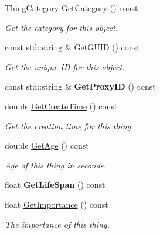\begin{DoxyCompactItemize}
\mbox{\label{class_i_thing_a8a52dd5d10428c02123a5728ad4778cb}} 
Thing\+Category \hyperlink{class_i_thing_a8a52dd5d10428c02123a5728ad4778cb}{Get\+Category} () const
\begin{DoxyCompactList}\small\item\em Get the category for this object. \end{DoxyCompactList}\item 
\mbox{\label{class_i_thing_a48a5ff5298034f14de4e8a87073f7a45}} 
const std\+::string \& \hyperlink{class_i_thing_a48a5ff5298034f14de4e8a87073f7a45}{Get\+G\+U\+ID} () const
\begin{DoxyCompactList}\small\item\em Get the unique ID for this object. \end{DoxyCompactList}\item 
\mbox{\label{class_i_thing_a3a0ba98bc1f6fd31344d860063ca7fea}} 
const std\+::string \& {\bfseries Get\+Proxy\+ID} () const
\item 
\mbox{\label{class_i_thing_ab664750ec76615c0191d99d050efebf9}} 
double \hyperlink{class_i_thing_ab664750ec76615c0191d99d050efebf9}{Get\+Create\+Time} () const
\begin{DoxyCompactList}\small\item\em Get the creation time for this thing. \end{DoxyCompactList}\item 
\mbox{\label{class_i_thing_a2214179561e0e1325de52a08ea3cce26}} 
double \hyperlink{class_i_thing_a2214179561e0e1325de52a08ea3cce26}{Get\+Age} () const
\begin{DoxyCompactList}\small\item\em Age of this thing in seconds. \end{DoxyCompactList}\item 
\mbox{\label{class_i_thing_a702fc99c3a5ccf2586a69f77ee59210f}} 
float {\bfseries Get\+Life\+Span} () const
\item 
\mbox{\label{class_i_thing_ac3ed9b799c7282ca83489a2a6601ea3f}} 
float \hyperlink{class_i_thing_ac3ed9b799c7282ca83489a2a6601ea3f}{Get\+Importance} () const
\begin{DoxyCompactList}\small\item\em The importance of this thing. \end{DoxyCompactList}\item 

\end{DoxyCompactItemize}
